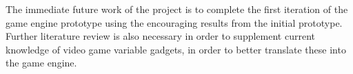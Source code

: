 \documentclass[a4paper]{article}
\begin{document}
The immediate future work of the project is to complete the first iteration of the game engine
prototype using the encouraging results from the initial prototype. Further literature review is
also necessary in order to supplement current knowledge of video game variable gadgets, in order to
better translate these into the game engine.

%
  



\pagebreak


 

\end{document}
